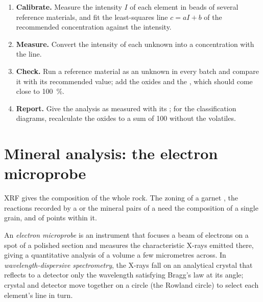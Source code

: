 \begin{method}\label{met:b2:field-lab-methods-2:calibration}
\begin{enumerate}
  \item \textbf{Calibrate.} Measure the intensity $I$ of each element in beads of several reference
        materials, and fit the least-squares line $c = aI + b$ of the recommended concentration
        against the intensity.
  \item \textbf{Measure.} Convert the intensity of each unknown into a concentration with the line.
  \item \textbf{Check.} Run a reference material as an unknown in every batch and compare it with
        its recommended value; add the oxides and the , which should come close
        to \qty{100}{\percent}.
  \item \textbf{Report.} Give the analysis as measured with its ; for the
        classification diagrams, recalculate the oxides to a sum of 100 without the volatiles.
\end{enumerate}
\end{method}

\section{Mineral analysis: the electron microprobe}\label{sec:b2:field-lab-methods-2:microprobe}

XRF gives the composition of the whole rock. The zoning of a garnet , the reactions
recorded by a  or the mineral pairs of a  need the composition of a single
grain, and of points within it.

\begin{definition}\label{def:b2:field-lab-methods-2:epma}
An \emph{electron microprobe} is an instrument that focuses a beam of
electrons on a spot of a polished section and measures the characteristic X-rays emitted there,
giving a quantitative analysis of a volume a few micrometres across. In
\emph{wavelength-dispersive spectrometry}, the X-rays fall
on an analytical crystal that reflects to a detector only the wavelength satisfying Bragg's law at
its angle; crystal and detector move together on a circle (the Rowland circle) to select each
element's line in turn.
\end{definition}

